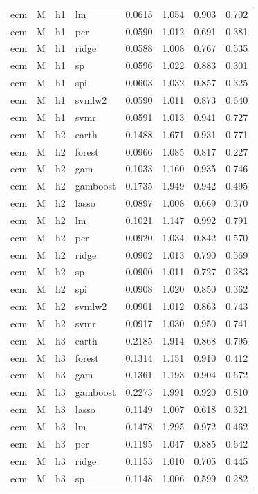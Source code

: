 \begin{ThreePartTable}
\begin{longtable}[t]{llclcccc}
ecm & M & h1 & lm & 0.0615 & 1.054 & 0.903 & 0.702\\
ecm & M & h1 & pcr & 0.0590 & 1.012 & 0.691 & 0.381\\
ecm & M & h1 & ridge & 0.0588 & 1.008 & 0.767 & 0.535\\
ecm & M & h1 & sp & 0.0596 & 1.022 & 0.883 & 0.301\\
ecm & M & h1 & spi & 0.0603 & 1.032 & 0.857 & 0.325\\
ecm & M & h1 & svmlw2 & 0.0590 & 1.011 & 0.873 & 0.640\\
ecm & M & h1 & svmr & 0.0591 & 1.013 & 0.941 & 0.727\\
\addlinespace
ecm & M & h2 & earth & 0.1488 & 1.671 & 0.931 & 0.771\\
ecm & M & h2 & forest & 0.0966 & 1.085 & 0.817 & 0.227\\
ecm & M & h2 & gam & 0.1033 & 1.160 & 0.935 & 0.746\\
ecm & M & h2 & gamboost & 0.1735 & 1.949 & 0.942 & 0.495\\
ecm & M & h2 & lasso & 0.0897 & 1.008 & 0.669 & 0.370\\
ecm & M & h2 & lm & 0.1021 & 1.147 & 0.992 & 0.791\\
ecm & M & h2 & pcr & 0.0920 & 1.034 & 0.842 & 0.570\\
ecm & M & h2 & ridge & 0.0902 & 1.013 & 0.790 & 0.569\\
ecm & M & h2 & sp & 0.0900 & 1.011 & 0.727 & 0.283\\
ecm & M & h2 & spi & 0.0908 & 1.020 & 0.850 & 0.362\\
ecm & M & h2 & svmlw2 & 0.0901 & 1.012 & 0.863 & 0.743\\
ecm & M & h2 & svmr & 0.0917 & 1.030 & 0.950 & 0.741\\
\addlinespace
ecm & M & h3 & earth & 0.2185 & 1.914 & 0.868 & 0.795\\
ecm & M & h3 & forest & 0.1314 & 1.151 & 0.910 & 0.412\\
ecm & M & h3 & gam & 0.1361 & 1.193 & 0.904 & 0.672\\
ecm & M & h3 & gamboost & 0.2273 & 1.991 & 0.920 & 0.810\\
ecm & M & h3 & lasso & 0.1149 & 1.007 & 0.618 & 0.321\\
ecm & M & h3 & lm & 0.1478 & 1.295 & 0.972 & 0.462\\
ecm & M & h3 & pcr & 0.1195 & 1.047 & 0.885 & 0.642\\
ecm & M & h3 & ridge & 0.1153 & 1.010 & 0.705 & 0.445\\
ecm & M & h3 & sp & 0.1148 & 1.006 & 0.599 & 0.282\\

\end{longtable}
\end{ThreePartTable}
